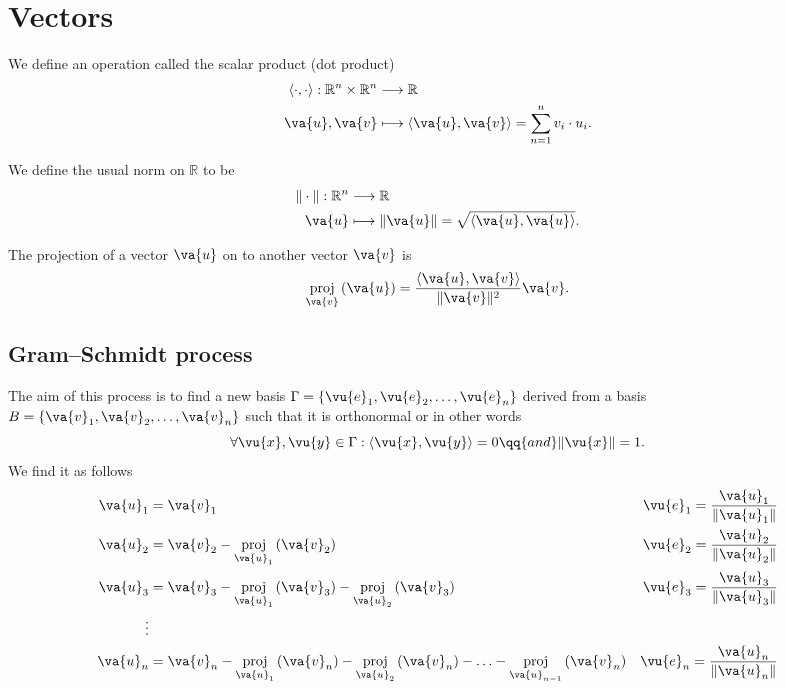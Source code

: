 \documentclass[a4paper,12pt]{article}
\DeclareMathOperator{\projection}{proj}
\newcommand{\dotp}[2]{\left\langle #1,#2 \right\rangle}
\newcommand{\proj}[2]{\projection_{#1}\left(#2\right)}
\begin{document}
\section{Vectors}
\begin{definition}
	We define an operation called the scalar product (dot product)
	\begin{align*}
		\dotp{\cdot}{\cdot}: \mathbb{R}^n \times \mathbb{R}^n & \longrightarrow \mathbb{R}                                     \\
		\va{u},\va{v}                                         & \longmapsto \dotp{\va{u}}{\va{v}} =\sum_{n=1}^{n} v_i\cdot u_i
		.\end{align*}
\end{definition}

\begin{definition}
	We define the usual norm on $\mathbb{R}$ to be
	\begin{align*}
		\|\cdot \|: \mathbb{R}^n & \longrightarrow \mathbb{R}                            \\
		\va{u}                   & \longmapsto \|\va{u}\| = \sqrt{\dotp{\va{u}}{\va{u}}}
		.\end{align*}
\end{definition}
\begin{theorem}
	The projection of a vector $\va{u}$ on to another vector $\va{v}$ is
	\[
		\proj{\va{v}}{\va{u}} = \frac{\dotp{\va{u}}{\va{v}}}{\|\va{v}\|^2}\va{v}
		.\]
\end{theorem}

\subsection{Gram–Schmidt process}
The aim of this process is to find a new basis $\Gamma=\{\vu{e}_1,\vu{e}_2,\ldots,\vu{e}_n\} $ derived from a basis $B=\{\va{v}_1,\va{v}_2,\ldots,\va{v}_n\} $ such that it is orthonormal or in other words
\[
	\forall \vu{x},\vu{y}\in \Gamma: \dotp{\vu{x}}{\vu{y}}=0 \qq{and} \|\vu{x}\|=1
	.\]
We find it as follows
\begin{align*}
	\va{u}_1 & = \va{v}_1 \quad                                                                                    & \vu{e}_1 = \frac{\va{u}_1}{\|\va{u}_1\|} \\
	\va{u}_2 & = \va{v}_2-\proj{\va{u}_1}{\va{v}_2}                                                                & \vu{e}_2 = \frac{\va{u}_2}{\|\va{u}_2\|} \\
	\va{u}_3 & = \va{v}_3-\proj{\va{u}_1}{\va{v}_3}-\proj{\va{u}_2}{\va{v}_3}                                      & \vu{e}_3 = \frac{\va{u}_3}{\|\va{u}_3\|} \\
	\vdots   &                                                                                                     &                                          \\
	\va{u}_n & = \va{v}_n-\proj{\va{u}_1}{\va{v}_n}-\proj{\va{u}_2}{\va{v}_n}-\ldots-\proj{\va{u}_{n-1}}{\va{v}_n} & \vu{e}_n= \frac{\va{u}_n}{\|\va{u}_n\|}  \\
\end{align*}
\end{document}
